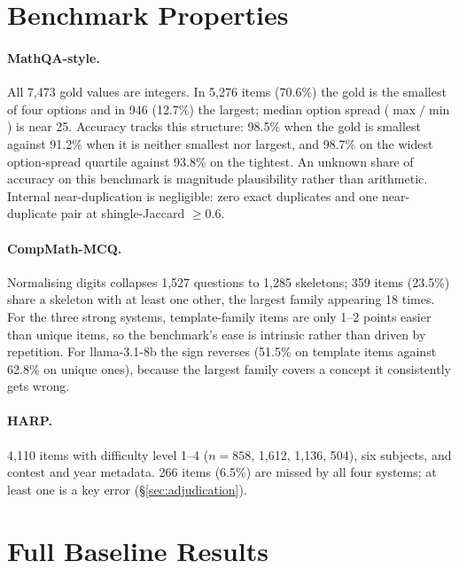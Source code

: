 \documentclass[11pt]{article}
\begin{document}
\section{Benchmark Properties}
\label{app:datasets}

\paragraph{MathQA-style.} All 7,473 gold values are integers. In 5,276 items (70.6\%) the gold is the smallest of four options and in 946 (12.7\%) the largest; median option spread ($\max/\min$) is near 25. Accuracy tracks this structure: 98.5\% when the gold is smallest against 91.2\% when it is neither smallest nor largest, and 98.7\% on the widest option-spread quartile against 93.8\% on the tightest. An unknown share of accuracy on this benchmark is magnitude plausibility rather than arithmetic. Internal near-duplication is negligible: zero exact duplicates and one near-duplicate pair at shingle-Jaccard $\geq 0.6$.

\paragraph{CompMath-MCQ.} Normalising digits collapses 1,527 questions to 1,285 skeletons; 359 items (23.5\%) share a skeleton with at least one other, the largest family appearing 18 times. For the three strong systems, template-family items are only 1--2 points easier than unique items, so the benchmark's ease is intrinsic rather than driven by repetition. For llama-3.1-8b the sign reverses (51.5\% on template items against 62.8\% on unique ones), because the largest family covers a concept it consistently gets wrong.

\paragraph{HARP.} 4,110 items with difficulty level 1--4 ($n = 858$, 1{,}612, 1{,}136, 504), six subjects, and contest and year metadata. 266 items (6.5\%) are missed by all four systems; at least one is a key error (\S\ref{sec:adjudication}).

\section{Full Baseline Results}
\label{app:baseline}
\end{document}
